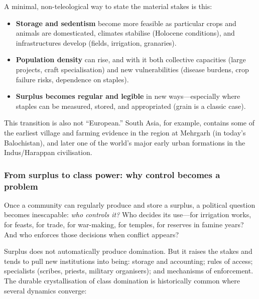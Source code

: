 A minimal, non-teleological way to state the material stakes is this:

\begin{itemize}[leftmargin=1.5em]
  \item \textbf{Storage and sedentism} become more feasible as particular crops and animals are domesticated,
        climates stabilise (Holocene conditions), and infrastructures develop (fields, irrigation, granaries).
  \item \textbf{Population density} can rise, and with it both collective capacities (large projects, craft
        specialisation) and new vulnerabilities (disease burdens, crop failure risks, dependence on staples).
  \item \textbf{Surplus becomes regular and legible} in new ways---especially where staples can be measured,
        stored, and appropriated (grain is a classic case).\cite{Scott2017}
\end{itemize}

This transition is also not ``European.'' South Asia, for example, contains some of the earliest village and
farming evidence in the region at Mehrgarh (in today’s Balochistan), and later one of the world’s major early
urban formations in the Indus/Harappan civilisation.\cite{CambridgeMehrgarh,OUPIndus}

\subsubsection{From surplus to class power: why control becomes a problem}
\label{sec:surplus-power}

Once a community can regularly produce and store a surplus, a political question becomes inescapable:
\emph{who controls it?} Who decides its use---for irrigation works, for feasts, for trade, for war-making,
for temples, for reserves in famine years? And who enforces those decisions when conflict appears?

Surplus does not automatically produce domination. But it raises the stakes and tends to pull new institutions
into being: storage and accounting; rules of access; specialists (scribes, priests, military organisers); and
mechanisms of enforcement. The durable crystallisation of class domination is historically common where several
dynamics converge:

